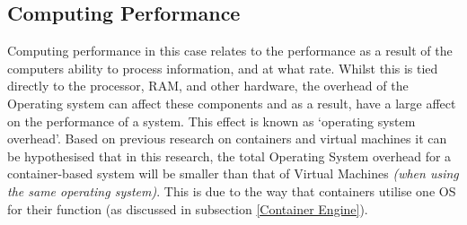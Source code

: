 \subsection{Computing Performance}
\label{computingperformance}
Computing performance in this case relates to the performance as a result of the computers ability to process information, and at what rate. Whilst this is tied directly to the processor, RAM, and other hardware, the overhead of the Operating system can affect these components and as a result, have a large affect on the performance of a system. This effect is known as `operating system overhead'. Based on previous research on containers and virtual machines it can be hypothesised that in this research, the total Operating System overhead for a container-based system will be smaller than that of Virtual Machines \emph{(when using the same operating system)}. This is due to the way that containers utilise one OS for their function (as discussed in subsection \ref{Container Engine}).

